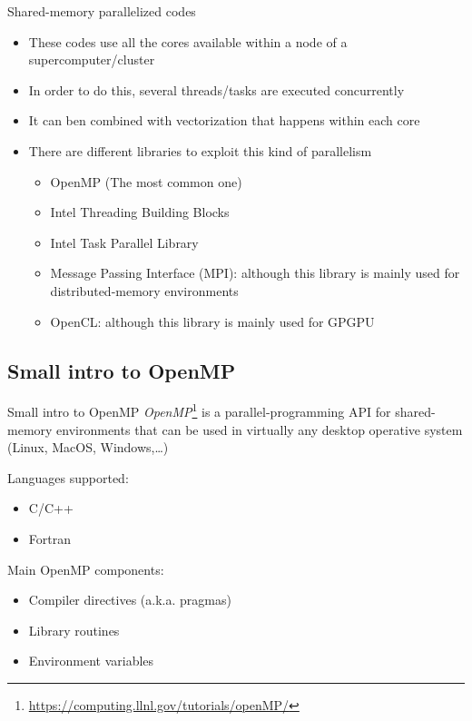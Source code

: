 \documentclass[10pt,xcolor=table]{beamer}
\begin{document}
\begin{frame}{Shared-memory parallelized codes}
\begin{itemize}
    \item These codes use all the cores available within a node of a supercomputer/cluster
    \item In order to do this, several threads/tasks are executed concurrently
    \item It can ben combined with vectorization that happens within each core
    \item There are different libraries to exploit this kind of parallelism
        \begin{itemize}
            \item OpenMP (The most common one) 
            \item Intel Threading Building Blocks
            \item Intel Task Parallel Library
            \item Message Passing Interface (MPI): although this library is mainly used for distributed-memory environments
            \item OpenCL: although this library is mainly used for GPGPU
        \end{itemize}
\end{itemize}
\end{frame}

\subsection{Small intro to OpenMP}

\begin{frame}{Small intro to OpenMP}
\emph{OpenMP}\footnote{\url{https://computing.llnl.gov/tutorials/openMP/}}  is a parallel-programming API for shared-memory environments that can be used in virtually any desktop operative system (Linux, MacOS, Windows,\ldots)

Languages supported:
\begin{itemize}
    \item C/C++
    \item Fortran
\end{itemize}

Main OpenMP components:
\begin{itemize}
    \item Compiler directives (a.k.a. pragmas)
    \item Library routines
    \item Environment variables
\end{itemize}

\end{frame}
\end{document}
